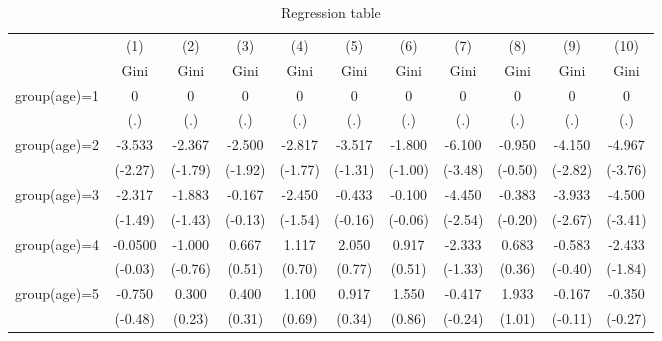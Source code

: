 \begin{table}[htbp]\centering
\caption{Regression table\label{tab1}}
\begin{tabular}{l*{10}{c}}
\hline\hline
                    &\multicolumn{1}{c}{(1)}&\multicolumn{1}{c}{(2)}&\multicolumn{1}{c}{(3)}&\multicolumn{1}{c}{(4)}&\multicolumn{1}{c}{(5)}&\multicolumn{1}{c}{(6)}&\multicolumn{1}{c}{(7)}&\multicolumn{1}{c}{(8)}&\multicolumn{1}{c}{(9)}&\multicolumn{1}{c}{(10)}\\
                    &\multicolumn{1}{c}{Gini}&\multicolumn{1}{c}{Gini}&\multicolumn{1}{c}{Gini}&\multicolumn{1}{c}{Gini}&\multicolumn{1}{c}{Gini}&\multicolumn{1}{c}{Gini}&\multicolumn{1}{c}{Gini}&\multicolumn{1}{c}{Gini}&\multicolumn{1}{c}{Gini}&\multicolumn{1}{c}{Gini}\\
\hline
group(age)=1        &           0&           0&           0&           0&           0&           0&           0&           0&           0&           0\\
                    &         (.)&         (.)&         (.)&         (.)&         (.)&         (.)&         (.)&         (.)&         (.)&         (.)\\
[1em]
group(age)=2        &      -3.533&      -2.367&      -2.500&      -2.817&      -3.517&      -1.800&      -6.100&      -0.950&      -4.150&      -4.967\\
                    &     (-2.27)&     (-1.79)&     (-1.92)&     (-1.77)&     (-1.31)&     (-1.00)&     (-3.48)&     (-0.50)&     (-2.82)&     (-3.76)\\
[1em]
group(age)=3        &      -2.317&      -1.883&      -0.167&      -2.450&      -0.433&      -0.100&      -4.450&      -0.383&      -3.933&      -4.500\\
                    &     (-1.49)&     (-1.43)&     (-0.13)&     (-1.54)&     (-0.16)&     (-0.06)&     (-2.54)&     (-0.20)&     (-2.67)&     (-3.41)\\
[1em]
group(age)=4        &     -0.0500&      -1.000&       0.667&       1.117&       2.050&       0.917&      -2.333&       0.683&      -0.583&      -2.433\\
                    &     (-0.03)&     (-0.76)&      (0.51)&      (0.70)&      (0.77)&      (0.51)&     (-1.33)&      (0.36)&     (-0.40)&     (-1.84)\\
[1em]
group(age)=5        &      -0.750&       0.300&       0.400&       1.100&       0.917&       1.550&      -0.417&       1.933&      -0.167&      -0.350\\
                    &     (-0.48)&      (0.23)&      (0.31)&      (0.69)&      (0.34)&      (0.86)&     (-0.24)&      (1.01)&     (-0.11)&     (-0.27)\\

\end{tabular}
\end{table}
